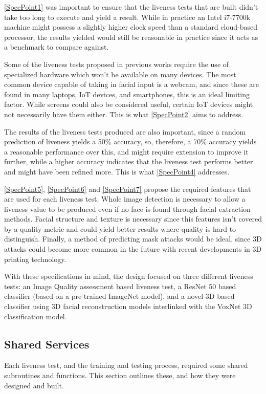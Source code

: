 \documentclass[12pt,a4paper]{article}
\begin{document}
        \ref{SpecPoint1} was important to ensure that the liveness tests that are built didn't take too long to execute and yield a result. While in practice an Intel i7-7700k machine might possess a
        slightly higher clock speed than a standard cloud-based processor, the results yielded would still be reasonable in practice since it acts as a benchmark to compare against.

        Some of the liveness tests proposed in previous works require the use of specialized hardware which won't be available on many devices. The most common device capable of taking in facial input is a
        webcam, and since these are found in many laptops, IoT devices, and smartphones, this is an ideal limiting factor. While screens could also be considered useful, certain IoT devices might not necessarily have them either.
        This is what \ref{SpecPoint2} aims to address.

        The results of the liveness tests produced are also important, since a random prediction of liveness yields a 50\% accuracy, so, therefore, a 70\% accuracy yields a reasonable performance over this, and might require extension to improve it further,
        while a higher accuracy indicates that the liveness test performs better and might have been refined more. This is what \ref{SpecPoint4} addresses.

        \ref{SpecPoint5}, \ref{SpecPoint6} and \ref{SpecPoint7} propose the required features that are used for each liveness test. Whole image detection is necessary to allow a liveness value to be produced even if no face is found through facial extraction methods. Facial structure and texture is necessary since this features isn't covered by a quality metric and could yield better results where quality is hard to distinguish. Finally, a method of predicting mask attacks would be ideal, since 3D attacks could become more common in the future with recent developments in 3D printing technology.

        With these specifications in mind, the design focused on three different liveness tests: an Image Quality assessment based liveness test, a ResNet 50 based classifier (based on a pre-trained ImageNet model),
        and a novel 3D based classifier using 3D facial reconstruction models interlinked with the VoxNet 3D classification model.


    \subsection{Shared Services}
        Each liveness test, and the training and testing process, required some shared subroutines and functions. This section outlines these, and how they were designed and built.
\end{document}
